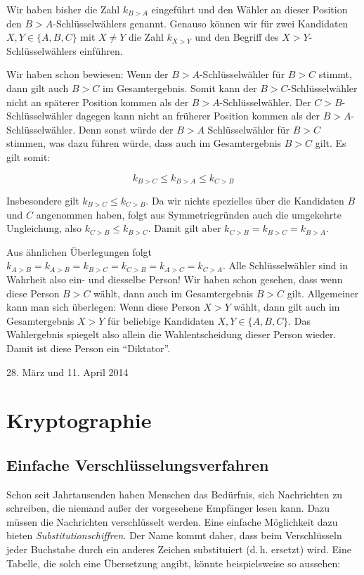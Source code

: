 \documentclass[a4paper,ngerman,12pt]{scrartcl}
\newcommand{\datum}[1]{\hfill {#1}\\}
\theoremstyle{definition}
\begin{document}
\begin{antw}
  Wir haben bisher die Zahl $k_{B>A}$ eingeführt und den Wähler an dieser Position den $B{>}A$-Schlüsselwählers genannt. Genauso können wir für zwei Kandidaten $X, Y \in \{ A, B, C \}$ mit $X \not= Y$ die Zahl $k_{X>Y}$ und den Begriff des $X{>}Y$-Schlüsselwählers einführen.

  Wir haben schon bewiesen: Wenn der $B{>}A$-Schlüsselwähler für $B>C$ stimmt, dann gilt auch $B>C$ im Gesamtergebnis. Somit kann der $B{>}C$-Schlüsselwähler nicht an späterer Position kommen als der $B{>}A$-Schlüsselwähler. Der $C{>}B$-Schlüsselwähler dagegen kann nicht an früherer Position kommen als der $B{>}A$-Schlüsselwähler. Denn sonst würde der $B{>}A$ Schlüsselwähler für $B{>}C$ stimmen, was dazu führen würde, dass auch im Gesamtergebnis $B{>}C$ gilt. Es gilt somit:

  \[ k_{B>C} \leq k_{B>A} \leq k_{C>B} \]

  Insbesondere gilt $k_{B>C} \leq k_{C>B}$. Da wir nichts spezielles über die Kandidaten $B$ und $C$ angenommen haben, folgt aus Symmetriegründen auch die umgekehrte Ungleichung, also $k_{C>B} \leq k_{B>C}$. Damit gilt aber $k_{C>B} = k_{B>C} = k_{B>A}$.

  Aus ähnlichen Überlegungen folgt $k_{A{>}B} = k_{A{>}B} = k_{B{>}C} = k_{C{>}B} = k_{A{>}C} = k_{C{>}A}$. Alle Schlüsselwähler sind in Wahrheit also ein- und diesselbe Person! Wir haben schon gesehen, dass wenn diese Person $B > C$ wählt, dann auch im Gesamtergebnis $B > C$ gilt. Allgemeiner kann man sich überlegen: Wenn diese Person $X > Y$ wählt, dann gilt auch im Gesamtergebnis $X > Y$ für beliebige Kandidaten $X, Y \in \{ A, B, C \}$. Das Wahlergebnis spiegelt also allein die Wahlentscheidung dieser Person wieder. Damit ist diese Person ein "`Diktator"'.
\end{antw}

\datum{28. März und 11. April 2014}

\section{Kryptographie}

\subsection{Einfache Verschlüsselungsverfahren}

Schon seit Jahrtausenden haben Menschen das Bedürfnis, sich Nachrichten zu schreiben, die niemand außer der vorgesehene Empfänger lesen kann. Dazu müssen die Nachrichten verschlüsselt werden. Eine einfache Möglichkeit dazu bieten \emph{Substitutionschiffren}. Der Name kommt daher, dass beim Verschlüsseln jeder Buchstabe durch ein anderes Zeichen substituiert (d.\,h. ersetzt) wird. Eine Tabelle, die solch eine Übersetzung angibt, könnte beispielsweise so aussehen:
\end{document}

